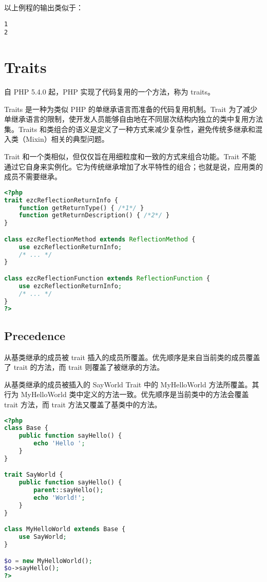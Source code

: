 以上例程的输出类似于：

\begin{verbatim}
1
2
\end{verbatim}



\chapter{Traits}


自 PHP 5.4.0 起，PHP 实现了代码复用的一个方法，称为 traits。

Traits 是一种为类似 PHP 的单继承语言而准备的代码复用机制。Trait 为了减少单继承语言的限制，使开发人员能够自由地在不同层次结构内独立的类中复用方法集。Traits 和类组合的语义是定义了一种方式来减少复杂性，避免传统多继承和混入类（Mixin）相关的典型问题。

Trait 和一个类相似，但仅仅旨在用细粒度和一致的方式来组合功能。Trait 不能通过它自身来实例化。它为传统继承增加了水平特性的组合；也就是说，应用类的成员不需要继承。

\begin{lstlisting}[language=PHP]
<?php
trait ezcReflectionReturnInfo {
    function getReturnType() { /*1*/ }
    function getReturnDescription() { /*2*/ }
}

class ezcReflectionMethod extends ReflectionMethod {
    use ezcReflectionReturnInfo;
    /* ... */
}

class ezcReflectionFunction extends ReflectionFunction {
    use ezcReflectionReturnInfo;
    /* ... */
}
?>
\end{lstlisting}


\section{Precedence}

从基类继承的成员被 trait 插入的成员所覆盖。优先顺序是来自当前类的成员覆盖了 trait 的方法，而 trait 则覆盖了被继承的方法。

从基类继承的成员被插入的 SayWorld Trait 中的 MyHelloWorld 方法所覆盖。其行为 MyHelloWorld 类中定义的方法一致。优先顺序是当前类中的方法会覆盖 trait 方法，而 trait 方法又覆盖了基类中的方法。

\begin{lstlisting}[language=PHP]
<?php
class Base {
    public function sayHello() {
        echo 'Hello ';
    }
}

trait SayWorld {
    public function sayHello() {
        parent::sayHello();
        echo 'World!';
    }
}

class MyHelloWorld extends Base {
    use SayWorld;
}

$o = new MyHelloWorld();
$o->sayHello();
?>
\end{lstlisting}


